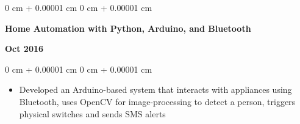 \documentclass[10pt, letterpaper]{article}
\newenvironment{highlights}{
    \begin{itemize}[
        topsep=0.10 cm,
        parsep=0.10 cm,
        partopsep=0pt,
        itemsep=0pt,
        leftmargin=0 cm + 10pt
    ]
}{
    \end{itemize}
} %
\newenvironment{onecolentry}{
    \begin{adjustwidth}{
        0 cm + 0.00001 cm
    }{
        0 cm + 0.00001 cm
    }
}{
    \end{adjustwidth}
} %
\newenvironment{twocolentry}[2][]{
    \onecolentry
    \def\secondColumn{#2}
    \setcolumnwidth{\fill, 4.5 cm}
    \begin{paracol}{2}
}{
    \switchcolumn \raggedleft \secondColumn
    \end{paracol}
    \endonecolentry
} %
\begin{document}
        \vspace{0.1 cm}
        \begin{twocolentry}
        {\textbf{Oct 2016}}
          \textbf{Home Automation with Python, Arduino, and Bluetooth}  
        \end{twocolentry}
        \vspace{0.10 cm}
        \begin{onecolentry}
            \begin{highlights}
                \item Developed an Arduino-based system that interacts with appliances using Bluetooth, uses OpenCV for image-processing to detect a person, triggers physical switches and sends SMS alerts
            \end{highlights}
        \end{onecolentry}
        \vspace{0.1 cm}
\end{document}
